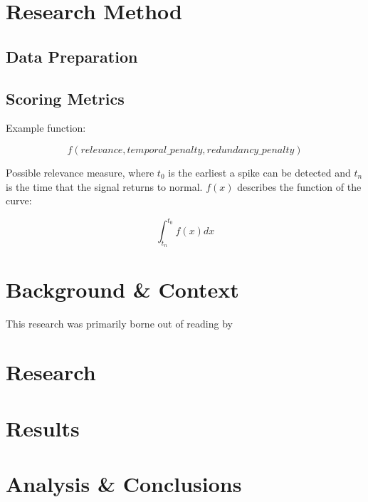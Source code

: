 \documentclass{uvamscse}	%
\begin{document}
\chapter{Research Method}

\section{Data Preparation}

\section{Scoring Metrics}

Example function:

\begin{equation}
	f(relevance, temporal\_penalty, redundancy\_penalty)
\end{equation}


Possible relevance measure, where $t_0$ is the earliest a spike can be detected and $t_n$ is the time that the signal 
returns to normal. $f(x)$ describes the function of the curve:

\begin{equation}
	\int^{t_0}_{t_n} f(x) dx
\end{equation}

\chapter{Background \& Context}

This research was primarily borne out of reading  by \citeauthor{Buntain2014}\cite{Buntain2014}

\chapter{Research}

\chapter{Results}

\chapter{Analysis \& Conclusions}


\printbibliography

\newpage

\end{document}
